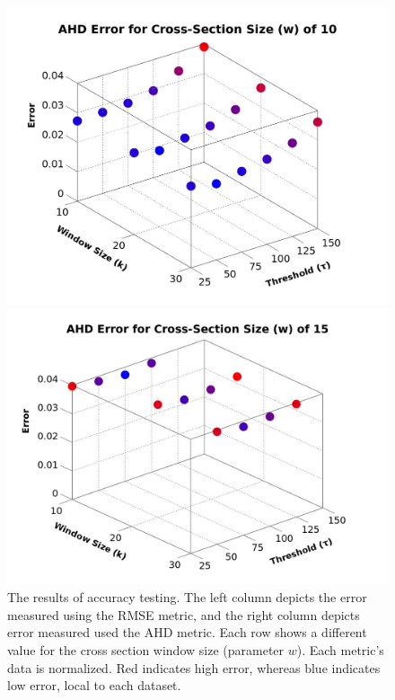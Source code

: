 \begin{figure}
\begin{center}
\begin{minipage} {0.49\linewidth}
    \includegraphics[height=0.25\textheight,width=0.99\linewidth]{images/AHD_Graph_CS10.jpg}

    \includegraphics[height=0.25\textheight,width=0.99\linewidth]{images/AHD_Graph_CS15.jpg}
  \end{minipage}
\end{center}
\caption[The results for the concept tests for the drill operator]{\label{figure:results} The results of accuracy testing. The left column depicts the error measured using the RMSE metric, and the right column depicts error measured used the AHD metric. Each row shows a different value for the cross section window size (parameter $w$). Each metric's data is normalized. Red indicates high error, whereas blue indicates low error, local to each dataset.   }
\end{figure}


